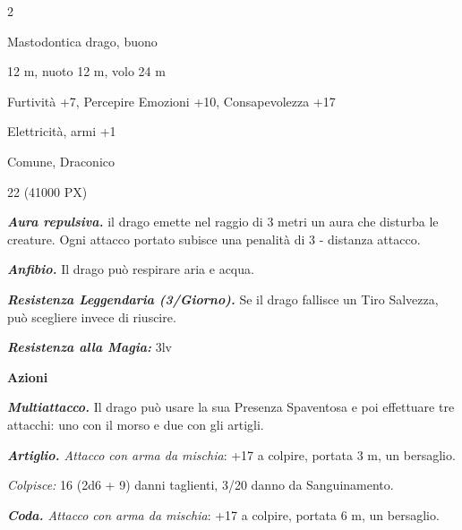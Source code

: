 \begin{multicols}{2}
{
\begin{description}[noitemsep, topsep=0pt, parsep=0pt, partopsep=0pt, itemsep=1pt, leftmargin=2.35cm,  labelwidth=2.2cm, itemindent=0cm, listparindent=0pt] %
\setlength{\baselineskip}{10pt}
\item[\textbf{Taglia/Tipo}] Mastodontica drago, buono
\item[\textbf{Caratt.}] 
\item[\textbf{Punti Ferita}] 
\item[\textbf{Movimento}] 12 m, nuoto 12 m, volo 24 m
\item[\textbf{Tiri Salvez.}] 
\item[\textbf{Comp.}] Furtività +7, Percepire Emozioni +10, Consapevolezza +17
\item[\textbf{Imm. Danni}] Elettricità, armi +1
\item[\textbf{Sensi}] 
\item[\textbf{Linguaggi}] Comune, Draconico
\item[\textbf{Sfida}] 22 (41000 PX)
\end{description}
\smallskip

\emph{\textbf{Aura repulsiva.}} il drago emette nel raggio di 3 metri un aura che disturba le creature. Ogni attacco portato subisce una penalità di 3 - distanza attacco.

\emph{\textbf{Anfibio.}} Il drago può respirare aria e acqua.

\emph{\textbf{Resistenza Leggendaria (3/Giorno).}} Se il drago fallisce un Tiro Salvezza, può scegliere invece di riuscire.

\emph{\textbf{Resistenza alla Magia:}} 3lv

\textbf{Azioni}

\emph{\textbf{Multiattacco.}} Il drago può usare la sua Presenza Spaventosa e poi effettuare tre attacchi: uno con il morso e due con gli artigli.

\emph{\textbf{Artiglio.} Attacco con arma da mischia}: +17 a colpire, portata 3 m, un bersaglio.

\emph{Colpisce:} 16 (2d6 + 9) danni taglienti, 3/20 danno da Sanguinamento.

\emph{\textbf{Coda.} Attacco con arma da mischia}: +17 a colpire, portata 6 m, un bersaglio.

}
\end{multicols}

